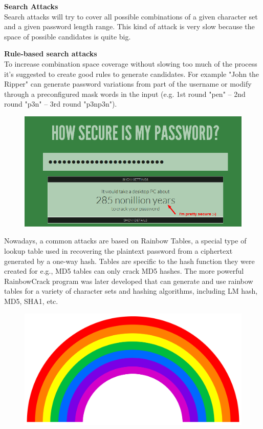 	{\bf Search Attacks} \\
	Search attacks will try to cover all possible combinations of a given character set and a given 
	password length range. This kind of attack is very slow because the space of possible candidates 
	is quite big. 

	{\bf Rule-based search attacks} \\
	To increase combination space coverage without slowing too much of the process it's suggested to 
	create good rules to generate candidates. For example "John the Ripper" can generate password 
	variations from part of the username or modify through a preconfigured mask words in the input 
	(e.g. 1st round "pen" -- 2nd round "p3n" -- 3rd round "p3np3n").

	\begin{figure}[H]
		\centering
		\includegraphics[scale=0.1]{pics/bruteforce2.png}
	\end{figure}

	\clearpage
	Nowadays, a common attacks are based on Rainbow Tables, a special type of lookup table used in 
	recovering the plaintext password from a ciphertext generated by a one-way hash.
	Tables are specific to the hash function they were created for e.g., MD5 tables can only crack MD5 
	hashes. The more powerful RainbowCrack program was later developed that can generate and use rainbow
	tables for a variety of character sets and hashing algorithms, including LM hash, MD5, SHA1, etc.

	\begin{figure}[H]
		\includegraphics[width=\textwidth]{pics/rainbow.png}
	\end{figure}





